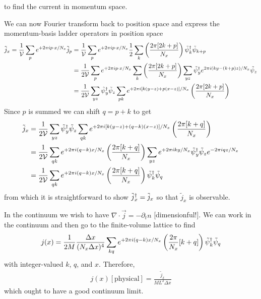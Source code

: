 to find the current in momentum space.

We can now Fourier transform back to position space and express the momentum-basis ladder operators in position space
\begin{align}
	\tilde{j}_x
	=
	\frac{1}{\mathcal{V}} \sum_p e^{+2\pi i p \cdot x / N_x} \tilde{j}_p 
	&=
	\frac{1}{\mathcal{V}} \sum_p e^{+2\pi i p \cdot x / N_x} 
	\frac{1}{2} \sum_k \left(\frac{2\pi [ 2k+p ]}{N_x}\right) \tilde{\psi}{}^{\dagger}_{k} \tilde{\psi}_{k+p}
	\nonumber\\
	&=
	\frac{1}{2\mathcal{V}} \sum_p e^{+2\pi i p \cdot x / N_x} 
	\sum_k \left(\frac{2\pi [ 2k+p ]}{N_x}\right) \sum_{yz} \tilde{\psi}{}^{\dagger}_{y} e^{2\pi i (ky - (k+p)z) / N_x} \tilde{\psi}_{z}
	\nonumber\\
	&=
	\frac{1}{2\mathcal{V}}
	\sum_{yz} \tilde{\psi}{}^{\dagger}_{y}  \tilde{\psi}_{z}
	\sum_{pk} e^{+2\pi i [ k (y-z) + p  (x-z) ]  / N_x} \left(\frac{2\pi [ 2k+p ]}{N_x}\right)
\end{align}
Since $p$ is summed we can shift $q=p+k$ to get
\begin{align}
	\tilde{j}_x
	&=
	\frac{1}{2\mathcal{V}}
	\sum_{yz} \tilde{\psi}{}^{\dagger}_{y}  \tilde{\psi}_{z}
	\sum_{qk} e^{+2\pi i [ k (y-z) + (q-k)  (x-z) ]  / N_x} \left(\frac{2\pi [ k+q ]}{N_x}\right)
	\nonumber\\
	&=
	\frac{1}{2\mathcal{V}}
	\sum_{qk} e^{+2\pi i (q-k) x / N_x} \left(\frac{2\pi [ k+q ]}{N_x}\right)
	\sum_{yz} e^{+2\pi i ky / N_x} \tilde{\psi}{}^{\dagger}_{y} \tilde{\psi}_{z} e^{-2\pi i q z / N_x}
	\\
	&=
	\frac{1}{2\mathcal{V}}
	\sum_{qk} e^{+2\pi i (q-k) x / N_x} \left(\frac{2\pi [ k+q ]}{N_x}\right)
	\tilde{\psi}{}^{\dagger}_{k} \tilde{\psi}_{q}
	\label{eq:current hermitian}
\end{align}
from which it is straightforward to show $\tilde{j}{}^{\dagger}_x = \tilde{j}_x$ so that $\tilde{j}_x$ is observable.

In the continuum we wish to have $\nabla\cdot\vec{j} = - \partial_t n$ [dimensionful!].
We can work in the continuum and then go to the finite-volume lattice to find
\begin{align}
	j(x) = \frac{1}{2M} \frac{\Delta x}{(N_x \Delta x)^4} \sum_{kq} e^{+2\pi i(q-k) x / N_x} \left(\frac{2\pi}{N_x}[ k+q ]\right) \tilde{\psi}{}^{\dagger}_k \tilde{\psi}_q
\end{align}
with integer-valued $k$, $q$, and $x$.
Therefore, 
\begin{align}
	j(x) [\text{physical}] = \frac{\tilde{j}_x}{ML^2 \Delta x}
	\label{eq:j physical}
\end{align}
which ought to have a good continuum limit.

